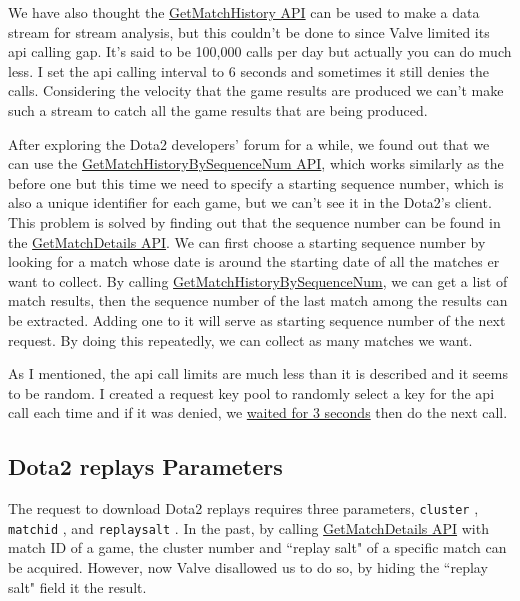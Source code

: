 \documentclass{article}
\newcommand{\codeinline}[1]{
    \texttt{#1}
}
\begin{document}
We have also thought the \href{https://wiki.teamfortress.com/wiki/WebAPI/GetMatchHistory}{GetMatchHistory API} can be used to make a data stream for stream analysis, but this couldn't be done to since Valve limited its api calling gap.
It's said to be 100,000 calls per day but actually you can do much less. I set the api calling interval to 6 seconds and sometimes it still denies the calls.
Considering the velocity that the game results are produced we can't make such a stream to catch all the game results that are being produced.

After exploring the Dota2 developers' forum for a while, we found out that we can use the \href{https://wiki.teamfortress.com/wiki/WebAPI/GetMatchHistoryBySequenceNum}{GetMatchHistoryBySequenceNum API}, which works similarly as the before one but this time we need to specify a starting sequence number, which is also a unique identifier for each game, but we can't see it in the Dota2's client.
This problem is solved by finding out that the sequence number can be found in the \href{https://wiki.teamfortress.com/wiki/WebAPI/GetMatchDetails}{GetMatchDetails API}.
We can first choose a starting sequence number by looking for a match whose date is around the starting date of all the matches er want to collect.
By calling \href{https://wiki.teamfortress.com/wiki/WebAPI/GetMatchHistoryBySequenceNum}{GetMatchHistoryBySequenceNum}, we can get a list of match results, then the sequence number of the last match among the results can be extracted. Adding one to it will serve as starting sequence number of the next request. By doing this repeatedly, we can collect as many matches we want.

As I mentioned, the api call limits are much less than it is described and it seems to be random. I created a request key pool to randomly select a key for the api call each time and if it was denied, we \href{https://github.com/Vopaaz/big-data-psg-lgd/blob/a9a285e0e29c0d9e56b41994875df830c7e7b51b/src/main/java/FetchStore/ValveAPI.java#L241-L249}{waited for 3 seconds} then do the next call.


\subsection{Dota2 replays Parameters}

The request to download Dota2 replays requires three parameters, \codeinline{cluster}, \codeinline{matchid}, and \codeinline{replaysalt}.
In the past, by calling \href{https://wiki.teamfortress.com/wiki/WebAPI/GetMatchDetails}{GetMatchDetails API} with match ID of a game, the cluster number and ``replay salt" of a specific match can be acquired. However, now Valve disallowed us to do so, by hiding the ``replay salt" field it the result.
\end{document}
